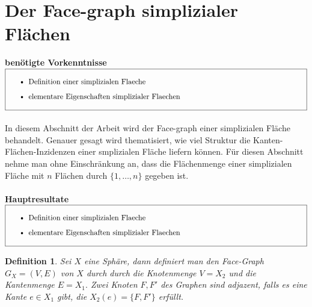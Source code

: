 \documentclass[12pt,titlepage,twoside,cleardoublepage]{article}
\theoremstyle{nummermitklammern}
\newtheorem{definition}[temp]{Definition}
\newtheorem{definition}[zahl]{Definition}
\numberwithin{equation}{section}
\begin{document}
\section{Der Face-graph simplizialer Flächen}
\textbf{benötigte Vorkenntnisse}\\
$\fbox{
\parbox{14cm}{\begin{itemize}
\item Definition einer simplizialen Flaeche 
\item elementare Eigenschaften simplizialer Flaechen
\end{itemize}
}}$\\\\
In diesem Abschnitt der Arbeit wird der Face-graph einer simplizialen Fläche behandelt. Genauer gesagt wird thematisiert, wie viel Struktur die Kanten-Flächen-Inzidenzen einer smplizialen Fläche liefern können.  
Für diesen Abschnitt nehme man ohne Einschränkung an, dass die Flächenmenge einer simplizialen Fläche mit $n$ Flächen  durch $\{1,\ldots,n\}$ gegeben ist.\\\\
\textbf{Hauptresultate}\\
$\fbox{
\parbox{14cm}{\begin{itemize}
\item Definition einer simplizialen Flaeche 
\item elementare Eigenschaften simplizialer Flaechen
\end{itemize}
}}$\\
\begin{definition}
Sei $X$ eine Sphäre, dann definiert man den Face-Graph $G_X=(V,E)$ von $X$ durch durch die Knotenmenge $V=X_2$ und die Kantenmenge $E=X_1.$ Zwei Knoten $F,F'$ des Graphen sind adjazent, falls es eine Kante $e\in X_1$ gibt, die $X_2(e)=\{F,F'\}$ erfüllt. 
\end{definition}
\end{document}
